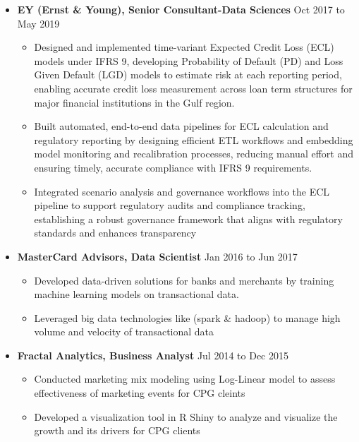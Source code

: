 \documentclass[a4paper,10pt]{article}
\begin{document}
\begin{itemize}[leftmargin=0.2cm, label={}]
    \item \textbf{EY (Ernst \& Young), Senior Consultant-Data Sciences} \hfill \textnormal{Oct 2017 to May 2019}
    \begin{itemize}[leftmargin=0.5cm, label={\textbullet}]
        \item Designed and implemented time-variant Expected Credit Loss (ECL) models under IFRS 9, developing Probability of Default (PD) and Loss Given Default (LGD) models to estimate risk at each reporting period, enabling accurate credit loss measurement across loan term structures for major financial institutions in the Gulf region.
        \item Built automated, end-to-end data pipelines for ECL calculation and regulatory reporting by designing efficient ETL workflows and embedding model monitoring and recalibration processes, reducing manual effort and ensuring timely, accurate compliance with IFRS 9 requirements.
        \item Integrated scenario analysis and governance workflows into the ECL pipeline to support regulatory audits and compliance tracking, establishing a robust governance framework that aligns with regulatory standards and enhances transparency
    \end{itemize}    
    
    \item \textbf{MasterCard Advisors, Data Scientist} \hfill \textnormal{Jan 2016 to Jun 2017}
    \begin{itemize}[leftmargin=0.5cm, label={\textbullet}]
        \item Developed data-driven solutions for banks and merchants by training machine learning models on transactional data.
        \item Leveraged big data technologies like (spark \& hadoop) to manage high volume and velocity of transactional data
    \end{itemize}
    
    \item \textbf{Fractal Analytics, Business Analyst} \hfill \textnormal{Jul 2014 to Dec 2015}
    \begin{itemize}[leftmargin=0.5cm, label={\textbullet}]
        \item Conducted marketing mix modeling using Log-Linear model to assess effectiveness of marketing events for CPG cleints 
        \item Developed a visualization tool in R Shiny to analyze and visualize the growth and its drivers for CPG clients
    \end{itemize}
\end{itemize}
\end{document}
